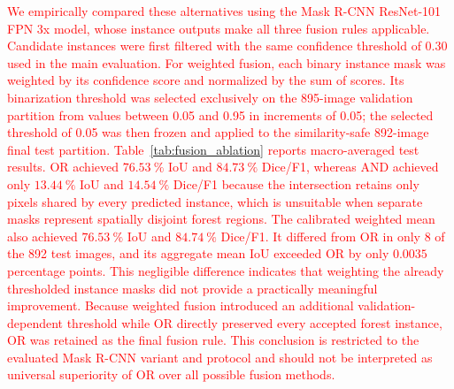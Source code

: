 \documentclass[journal,article,submit,pdftex,moreauthors]{Definitions/mdpi}
\begin{document}
\textcolor{red}{We empirically compared these alternatives using the Mask R-CNN ResNet-101 FPN 3x model, whose instance outputs make all three fusion rules applicable. Candidate instances were first filtered with the same confidence threshold of 0.30 used in the main evaluation. For weighted fusion, each binary instance mask was weighted by its confidence score and normalized by the sum of scores. Its binarization threshold was selected exclusively on the 895-image validation partition from values between 0.05 and 0.95 in increments of 0.05; the selected threshold of 0.05 was then frozen and applied to the similarity-safe 892-image final test partition. Table~\ref{tab:fusion_ablation} reports macro-averaged test results. OR achieved $76.53~\%$ IoU and $84.73~\%$ Dice/F1, whereas AND achieved only $13.44~\%$ IoU and $14.54~\%$ Dice/F1 because the intersection retains only pixels shared by every predicted instance, which is unsuitable when separate masks represent spatially disjoint forest regions. The calibrated weighted mean also achieved $76.53~\%$ IoU and $84.74~\%$ Dice/F1. It differed from OR in only 8 of the 892 test images, and its aggregate mean IoU exceeded OR by only $0.0035$ percentage points. This negligible difference indicates that weighting the already thresholded instance masks did not provide a practically meaningful improvement. Because weighted fusion introduced an additional validation-dependent threshold while OR directly preserved every accepted forest instance, OR was retained as the final fusion rule. This conclusion is restricted to the evaluated Mask R-CNN variant and protocol and should not be interpreted as universal superiority of OR over all possible fusion methods.}

\begin{table}[t]
\color{red}
\centering
\caption{Ablation of instance-mask fusion rules on the similarity-safe 892-image final test partition using Mask R-CNN ResNet-101 FPN 3x. OR and weighted-mean IoU values coincide at two-decimal precision; their per-image predictions differed in 8 cases, and their aggregate mean IoU differed by 0.0035 percentage points.}
\label{tab:fusion_ablation}
\end{table}
\end{document}

